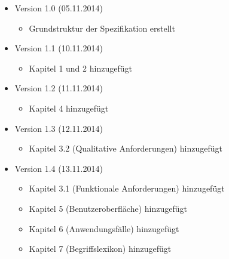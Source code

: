 \documentclass[11pt]{article}
\begin{document}
\begin{itemize}
	\item Version 1.0 (05.11.2014)
	\begin{itemize}
		\item Grundstruktur der Spezifikation erstellt
	\end{itemize}
	\item Version 1.1 (10.11.2014)
	\begin{itemize}
		\item Kapitel 1 und 2 hinzugefügt
	\end{itemize}
	\item Version 1.2 (11.11.2014)
	\begin{itemize}	
		\item Kapitel 4 hinzugefügt
	\end{itemize}
	\item Version 1.3 (12.11.2014)
	\begin{itemize}
		\item Kapitel 3.2 (Qualitative Anforderungen) hinzugefügt
	\end{itemize}
	\item Version 1.4 (13.11.2014)
	\begin{itemize}
		\item Kapitel 3.1 (Funktionale Anforderungen) hinzugefügt
		\item Kapitel 5 (Benutzeroberfläche) hinzugefügt
		\item Kapitel 6 (Anwendungsfälle) hinzugefügt
		\item Kapitel 7 (Begriffslexikon) hinzugefügt
	\end{itemize}
\end{itemize}
\end{document}
